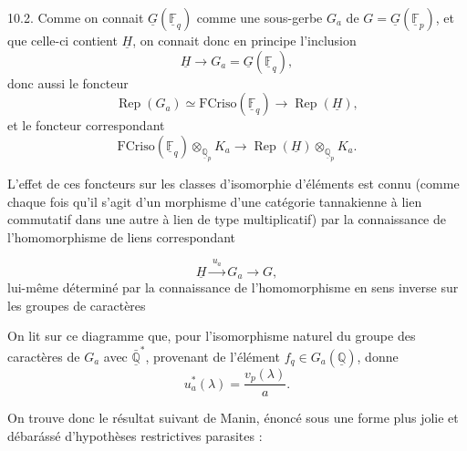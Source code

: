 \documentclass[11pt,a4paper]{article}
\begin{document}
10.2. Comme on connait $\underline{G}(\underline{\mathbb{F}}_{q})$ comme une
sous-gerbe $G_{a}$ de $G = \underline{G}(\underline{\mathbb{F}}_{p})$, et que
celle-ci contient $\underline{H}$, on connait donc en principe l'inclusion
\[
\underline{H} \longrightarrow
G_{a} = \underline{G}(\underline{\mathbb{F}}_{q}) ,
\]
donc aussi le foncteur
\[
\operatorname{Rep}(G_{a}) \simeq
\mathrm{FCriso}(\underline{\mathbb{F}}_{q}) \longrightarrow
\operatorname{Rep}(\underline{H}) ,
\]
 et le foncteur correspondant
\[
\mathrm{FCriso}(\underline{\mathbb{F}}_{q})
  \otimes_{\underline{\mathbb{Q}}_{p}} K_{a}
\longrightarrow
\operatorname{Rep}(\underline{H})
  \otimes_{\underline{\mathbb{Q}}_{p}} K_{a} .
\]

L'effet de ces foncteurs sur les classes d'isomorphie d'éléments est connu
(comme chaque fois qu'il s'agit d'un morphisme d'une 
catégorie tannakienne à lien commutatif dans une autre à lien de type
multiplicatif) par la connaissance de l'homomorphisme de liens correspondant

\[
\underline{H} \xrightarrow{\;u_{a}\;} G_{a} \longrightarrow G ,
\]
lui-même déterminé par la connaissance de l'homomorphisme en sens inverse sur
les groupes de caractères


On lit sur ce diagramme que, pour l'isomorphisme naturel du groupe des
caractères de $G_{a}$ avec $\bar{\underline{\mathbb{Q}}}^{*}$, provenant de
l'élément $f_{q} \in G_{a}(\underline{\mathbb{Q}})$,  
donne
\[
u_{a}^{*}(\lambda) = \frac{v_{p}(\lambda)}{a} .
\]

On trouve donc le résultat suivant de Manin, énoncé sous une forme plus jolie
et débarássé d'hypothèses restrictives parasites :
\end{document}

